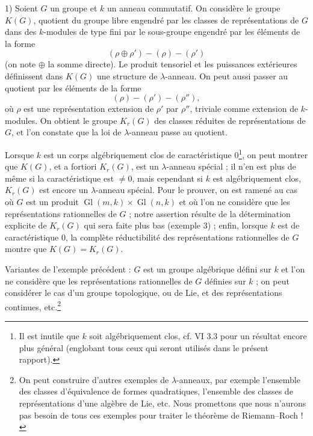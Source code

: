 \documentclass[11pt]{article}
\providecommand{\Gl}{\operatorname{Gl}}
\begin{document}
1) Soient $G$ un groupe et $k$ un anneau commutatif. On considère le groupe $K(G)$, quotient du groupe libre engendré par les classes de représentations de $G$ dans des $k$-modules de type fini par le sous-groupe engendré par les éléments de la forme
\[
(\rho\oplus\rho')-(\rho)-(\rho')
\]
(on note $\oplus$ la somme directe). Le produit tensoriel et les puissances extérieures définissent dans $K(G)$ une structure de $\lambda$-anneau. On peut aussi passer au quotient par les éléments de la forme
\[
(\rho)-(\rho')-(\rho''),
\]
où $\rho$ est une représentation extension de $\rho'$ par $\rho''$, triviale comme extension de $k$-modules. On obtient le groupe $K_r(G)$ des classes réduites de représentations de $G$, et l'on constate que la loi de $\lambda$-anneau passe au quotient.

Lorsque $k$ est un corps algébriquement clos de caractéristique $0$\footnote{Il est inutile que $k$ soit algébriquement clos, cf. VI 3.3 pour un résultat encore plus général (englobant tous ceux qui seront utilisés dans le présent rapport).}, on peut montrer que $K(G)$, et a fortiori $K_r(G)$, est un $\lambda$-anneau spécial ; il n'en est plus de même si la caractéristique est $\neq 0$, mais cependant si $k$ est algébriquement clos, $K_r(G)$ est encore un $\lambda$-anneau spécial. Pour le prouver, on est ramené au cas où $G$ est un produit $\Gl(m,k)\times\Gl(n,k)$ et où l'on ne considère que les représentations rationnelles de $G$ ; notre assertion résulte de la détermination explicite de $K_r(G)$ qui sera faite plus bas (exemple 3) ; enfin, lorsque $k$ est de caractéristique $0$, la complète réductibilité des représentations rationnelles de $G$ montre que $K(G)=K_r(G)$.

Variantes de l'exemple précédent : $G$ est un groupe algébrique défini sur $k$ et l'on ne considère que les représentations rationnelles de $G$ définies sur $k$ ; on peut considérer le cas d'un groupe topologique, ou de Lie, et des représentations continues, etc.\footnote{On peut construire d'autres exemples de $\lambda$-anneaux, par exemple l'ensemble des classes d'équivalence de formes quadratiques, l'ensemble des classes de représentations d'une algèbre de Lie, etc. Nous promettons que nous n'aurons pas besoin de tous ces exemples pour traiter le théorème de Riemann--Roch !}
\end{document}
